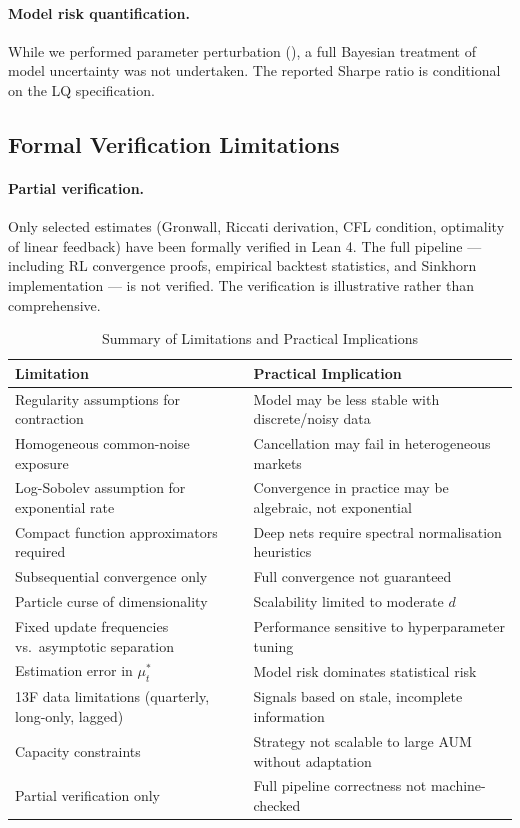 \paragraph{Model risk quantification.} While we performed parameter perturbation
(), a full Bayesian treatment of model uncertainty was
not undertaken. The reported Sharpe ratio is conditional on the LQ specification.

\subsection{Formal Verification Limitations}

\paragraph{Partial verification.} Only selected estimates (Gronwall, Riccati
derivation, CFL condition, optimality of linear feedback) have been formally
verified in Lean 4. The full pipeline --- including RL convergence proofs,
empirical backtest statistics, and Sinkhorn implementation --- is not verified.
The verification is illustrative rather than comprehensive.

\begin{table}[ht]
\centering
\small
\caption{Summary of Limitations and Practical Implications}
\label{tab:syn-limitations-summary}
\begin{tabular}{p{4cm}p{6.5cm}}
\toprule
\textbf{Limitation} & \textbf{Practical Implication} \\
\midrule
Regularity assumptions for contraction & Model may be less stable with
    discrete/noisy data \\
Homogeneous common-noise exposure & Cancellation may fail in heterogeneous
    markets \\
Log-Sobolev assumption for exponential rate & Convergence in practice may be
    algebraic, not exponential \\
Compact function approximators required & Deep nets require spectral
    normalisation heuristics \\
Subsequential convergence only & Full convergence not guaranteed \\
Particle curse of dimensionality & Scalability limited to moderate $d$ \\
Fixed update frequencies vs.\ asymptotic separation & Performance sensitive to
    hyperparameter tuning \\
Estimation error in $\mu_t^*$ & Model risk dominates statistical risk \\
13F data limitations (quarterly, long-only, lagged) & Signals based on stale,
    incomplete information \\
Capacity constraints & Strategy not scalable to large AUM without adaptation \\
Partial verification only & Full pipeline correctness not machine-checked \\
\bottomrule
\end{tabular}
\end{table}


